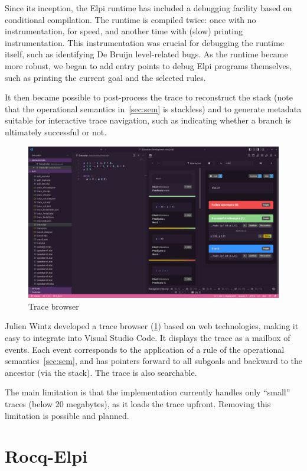 \documentclass[a4paper, 11pt]{book}
\begin{document}
Since its inception, the Elpi runtime has included a debugging facility based
on conditional compilation. The runtime is compiled twice: once with
no instrumentation, for speed, and another time with (slow) printing
instrumentation. This instrumentation was crucial for debugging the runtime
itself, such as identifying De Bruijn level-related bugs. As the runtime
became more robust, we began to add entry points to debug Elpi programs
themselves, such as printing the current goal and the selected rules.

It then became possible to post-process the trace to reconstruct the
stack (note that the operational semantics in~\cref{sec:sem} is stackless)
and to generate metadata suitable for interactive trace navigation, such as
indicating whether a branch is ultimately successful or not.

\begin{figure}
    \includegraphics[width=.9\textwidth]{elpi-tracer}
    \caption{Trace browser\label{fig:trace}}
\end{figure}

Julien Wintz developed a trace browser (\cref{fig:trace}) based on web
technologies, making it easy to integrate into Visual Studio Code. It displays
the trace as a mailbox of events. Each event corresponds to the application of
a rule of the operational semantics~\cref{sec:sem}, and has pointers forward
to all subgoals and backward to the ancestor (via the stack). The trace is
also searchable.

The main limitation is that the implementation currently handles only
``small'' traces (below 20 megabytes), as it loads the trace upfront. Removing
this limitation is possible and planned.

\chapter{Rocq-Elpi}\label{sec:rocq}
\end{document}
